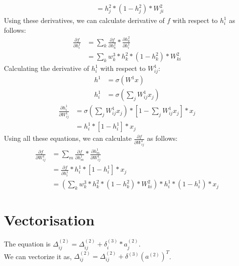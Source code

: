 \documentclass[english,a4paper,12pt]{article}
\begin{document}
{\begin{equation*}
\begin{split}
                & = h_{j}^{2} * (1 - h_{j}^{2}) * W_{ji}^{2}
            \end{split}
        \end{equation*}
    Using these derivatives, we can calculate derivative of $f$ with respect to $h_{i}^{1}$ as follows:
    \begin{equation*}
        \begin{split}
            \frac{\partial f}{\partial h_{i}^{1}} & =  \sum_{k} \frac{\partial f}{\partial h_{k}^{2}} * \frac{\partial h_{k}^{2}}{\partial h_{i}^{1}}\\
            & = \sum_{k} w_{k}^{3} * h_{k}^{2} * (1 - h_{k}^{2}) * W_{ki}^{2}
        \end{split}
    \end{equation*}
    Calculating the derivative of $h_{i}^{1}$ with respect to $W_{ij}^{1}$:
    \begin{equation*}
        \begin{split}
            h^{1} & = \sigma(W^{1}x)\\
            h_{i}^{1} & = \sigma(\sum_{j}W_{ij}^{1}x_{j})
        \end{split}
    \end{equation*}
    \begin{equation*}
        \begin{split}
            \frac{\partial h_{i}^{1}}{\partial W_{ij}^{1}} & = \sigma(\sum_{j}W_{ij}^{1}x_{j}) * [1 - \sum_{j}W_{ij}^{1}x_{j}] * x_{j}\\
            & = h_{i}^{1} * [1 - h_{i}^{1}] * x_{j}
        \end{split}
    \end{equation*}
    Using all these equations, we can calculate $\frac{\partial f}{\partial W_{ij}^{1}}$ as follows:
    \begin{equation*}
        \begin{split}
            \frac{\partial f}{\partial W_{ij}^{1}} & = \sum_{m} \frac{\partial f}{\partial h_{m}^{1}} * \frac{\partial h_{m}^{1}}{\partial W_{ij}^{1}}\\
            & = \frac{\partial f}{\partial h_{i}^{1}} * h_{i}^{1} * [1 - h_{i}^{1}] * x_{j} \\
            & = \boxed {  \left(\sum_{k} w_{k}^{3} * h_{k}^{2} * (1 - h_{k}^{2}) * W_{ki}^{2} \right) * h_{i}^{1} * (1 - h_{i}^{1}) * x_{j}}
        \end{split}
    \end{equation*}
}
\section{Vectorisation}{
The equation is $\Delta_{ij}^{(2)} = \Delta_{ij}^{(2)} + \delta_{i}^{(3)} * a_{j}^{(2)}$. \\
We can vectorize it as,
$\Delta_{ij}^{(2)} = \Delta_{ij}^{(2)} + \delta^{(3)}(a^{(2)})^{T}$.

}
\end{document}
